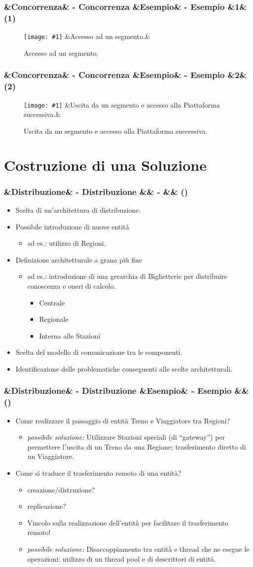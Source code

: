 \documentclass[slidestop,compress,blackandwhite]{beamer}
\newcommand{\ii}[1]{\textit{#1}}
\newcommand{\newtitle}[4]{
	#1 
	\ifx&#2&%
	\else
  		\large- #2
	\fi
	\ifx&#3&%
	\else
  		\normalsize- #3
	\fi
	\ifx&#4&%
	\else
  		\normalsize (#4)
	\fi
}
\newcommand{\newframe}[5]{
	\begin{frame}
		\frametitle{\newtitle{#1}{#2}{#3}{#4}}
		#5
	\end{frame}
}
\newcommand{\myitemize}[1]{
	\begin{itemize}\itemsep4pt
	#1
	\end{itemize}
}
\newcommand{\newfigure}[3]{
	\begin{figure}
		\centering
		\texttt{[image: \#1]}
		\ifx&#3&%
		\else
	  		\caption{\scriptsize #3}
		\fi
	\end{figure}
}
\begin{document}
	\newframe{}{Concorrenza}{Esempio}{1}{
		\newfigure{imgs/ingresso_segmento}{0.5}{Accesso ad un segmento.}
	}
	
	\newframe{}{Concorrenza}{Esempio}{2}{
		\newfigure{imgs/ingresso_stazione}{0.5}{Uscita da un segmento e accesso alla Piattaforma successiva.}
	}
	
	
	
\section{Costruzione di una Soluzione}\label{sol}

	\newframe{}{Distribuzione}{}{} {
		\myitemize {
			\item Scelta di un'architettura di distribuzione.
			\item Possibile introduzione di nuove entità
				\myitemize {
					\item ad es.: utilizzo di Regioni.
				}
			\item Definizione architetturale a grana più fine
				\myitemize {
					\item ad es.: introduzione di una gerarchia di Biglietterie per distribuire conoscenza e oneri di calcolo.
						\myitemize {
							\item Centrale
							\item Regionale
							\item Interna alle Stazioni
						}
				}
			\item Scelta del modello di comunicazione tra le componenti.
			\item Identificazione delle problematiche conseguenti alle scelte architetturali.
				
		}
	}

	\newframe{}{Distribuzione}{Esempio}{} {
		\myitemize {
			\item Come realizzare il passaggio di entità Treno e Viaggiatore tra Regioni?
				\myitemize {
					\item \ii{possibile soluzione:} Utilizzare Stazioni speciali (di ``gateway'') per permettere l'uscita di un Treno da una Regione; trasferimento diretto di un Viaggiatore.
				}
			\item Come si traduce il trasferimento remoto di una entità?
				\myitemize {
					\item creazione/distruzione?
					\item replicazione?
					\item Vincolo sulla realizzazione dell'entità per facilitare il trasferimento remoto!
					\item \ii{possibile soluzione:} Disaccoppiamento tra entità e thread che ne esegue le operazioni: utilizzo di un thread pool e di descrittori di entità.
				}
		}
	}
	
\end{document}
